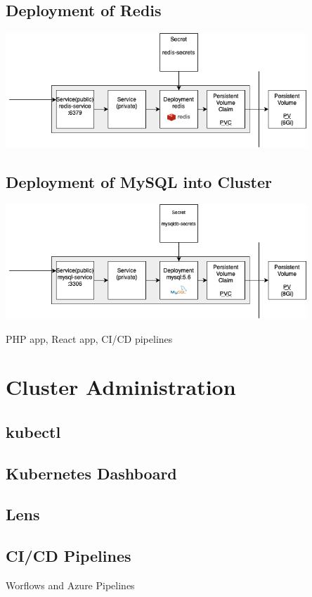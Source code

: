 \documentclass{article}
\begin{document}
\subsection{Deployment of Redis}
\begin{center}
  \includegraphics[width=0.850\textwidth]{redis-deployment.png}
\end{center}
\subsection{Deployment of MySQL into Cluster}
\begin{center}
  \includegraphics[width=0.850\textwidth]{mysql-deployment.png}
\end{center}
PHP app, React app, CI/CD pipelines
\section{Cluster Administration}
\subsection{kubectl}
\subsection{Kubernetes Dashboard}
\subsection{Lens}
\subsection{CI/CD Pipelines}
Worflows and Azure Pipelines
\end{document}

